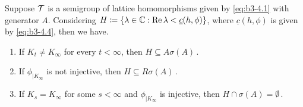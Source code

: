 \begin{theorem}\label{thm:b3-4.4}
	Suppose $\mathcal{T}$ is a semigroup of lattice homomorphisms given by \eqref{eq:b3-4.1} with generator $A$.
	Considering $H \coloneq \{\lambda \in \mathbb{C} : \mathop{}\!\mathrm{Re}\,\lambda < \underline{c}(h,\phi)\}$, where $\underline{c}(h,\phi)$ is given by \eqref{eq:b3-4.4}, then we have.
	\begin{enumerate}[\upshape (i)]
		\item 
		If $K_{t} \neq K_{\infty}$ for every $t < \infty$, then $H \subseteq A\sigma(A)$\,.
	
		\item 
		If $\phi_{|K_{\infty}}$ is not injective, then $H \subseteq R\sigma(A)$\,.
	
		\item 
		If $K_{s} = K_{\infty}$ for some $s < \infty$ and $\phi_{|K_{\infty}}$ is injective, then $H\cap\sigma(A) = \emptyset$\,.
	\end{enumerate} 
\end{theorem}
